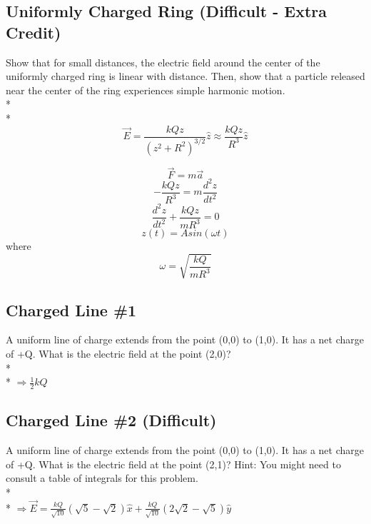 \documentclass[11pt]{article}
\begin{document}
\subsection{Uniformly Charged Ring (Difficult - Extra Credit)}
Show that for small distances, the electric field around the center of the uniformly charged ring is linear with distance.  Then, show that a particle released near the center of the ring experiences simple harmonic motion. \\* \\*
\begin{equation}
\vec{E} = \frac{kQz}{(z^2 + R^2)^{3/2}}\hat{z} \approx \frac{kQz}{R^3}\hat{z}
\end{equation}

\begin{equation}
\vec{F} = m \vec{a}
\end{equation}
\begin{equation}
-\frac{kQz}{R^3} = m\frac{d^2z}{dt^2}
\end{equation}
\begin{equation}
\frac{d^2z}{dt^2} + \frac{kQz}{mR^3} = 0
\end{equation}
\begin{equation}
z(t) = Asin(\omega t)
\end{equation}
where
\begin{equation}
\omega = \sqrt{\frac{kQ}{mR^3}}
\end{equation}

\pagebreak
\subsection{Charged Line \#1}
A uniform line of charge extends from the point (0,0) to (1,0).  It has a net charge of +Q.  What is the electric field at the point (2,0)? \\* \\*
$\Rightarrow \frac{1}{2}kQ$

\subsection{Charged Line \#2 (Difficult)}
A uniform line of charge extends from the point (0,0) to (1,0).  It has a net charge of +Q.  What is the electric field at the point (2,1)?  Hint: You might need to consult a table of integrals for this problem. \\* \\*
$\Rightarrow \vec{E} = \frac{kQ}{\sqrt{10}}(\sqrt{5} - \sqrt{2})\hat{x} + \frac{kQ}{\sqrt{10}}(2\sqrt{2} - \sqrt{5})\hat{y}$
\end{document}
